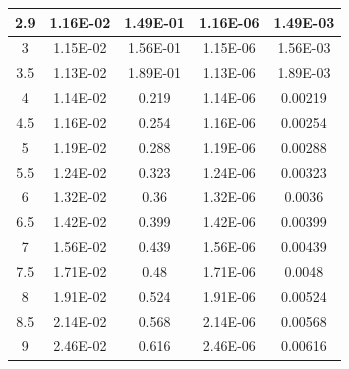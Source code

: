 \documentclass[11pt, a4paper, twocolumn]{article}
\begin{document}
\begin{longtable}[c]{|
>{\columncolor[HTML]{EFEFEF}}c |c|c|c|c|}
2.9                & 1.16E-02                       & 1.49E-01                       & 1.16E-06                   & 1.49E-03                   \\ \hline
3                  & 1.15E-02                       & 1.56E-01                       & 1.15E-06                   & 1.56E-03                   \\ \hline
3.5                & 1.13E-02                       & 1.89E-01                       & 1.13E-06                   & 1.89E-03                   \\ \hline
4                  & 1.14E-02                       & 0.219                          & 1.14E-06                   & 0.00219                    \\ \hline
4.5                & 1.16E-02                       & 0.254                          & 1.16E-06                   & 0.00254                    \\ \hline
5                  & 1.19E-02                       & 0.288                          & 1.19E-06                   & 0.00288                    \\ \hline
5.5                & 1.24E-02                       & 0.323                          & 1.24E-06                   & 0.00323                    \\ \hline
6                  & 1.32E-02                       & 0.36                           & 1.32E-06                   & 0.0036                     \\ \hline
6.5                & 1.42E-02                       & 0.399                          & 1.42E-06                   & 0.00399                    \\ \hline
7                  & 1.56E-02                       & 0.439                          & 1.56E-06                   & 0.00439                    \\ \hline
7.5                & 1.71E-02                       & 0.48                           & 1.71E-06                   & 0.0048                     \\ \hline
8                  & 1.91E-02                       & 0.524                          & 1.91E-06                   & 0.00524                    \\ \hline
8.5                & 2.14E-02                       & 0.568                          & 2.14E-06                   & 0.00568                    \\ \hline
9                  & 2.46E-02                       & 0.616                          & 2.46E-06                   & 0.00616                    \\ \hline

\end{longtable}
\end{document}
